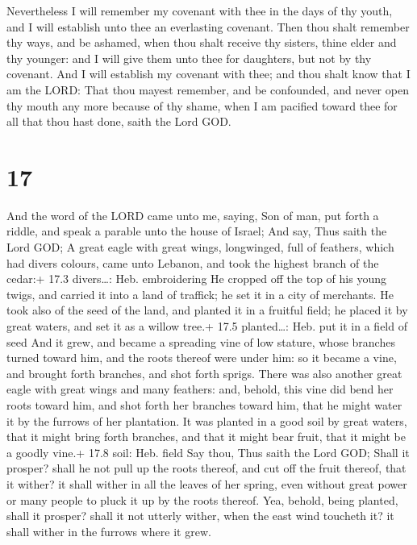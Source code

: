  Nevertheless I will remember my covenant with thee in
the days of thy youth, and I will establish unto thee an everlasting
covenant.  Then thou shalt remember thy ways, and be
ashamed, when thou shalt receive thy sisters, thine elder and thy
younger: and I will give them unto thee for daughters, but not by thy
covenant.  And I will establish my covenant with thee; and
thou shalt know that I am the LORD:  That thou mayest
remember, and be confounded, and never open thy mouth any more because
of thy shame, when I am pacified toward thee for all that thou hast
done, saith the Lord GOD.

\hypertarget{section-16}{%
\section{17}\label{section-16}}

 And the word of the LORD came unto me, saying, 
Son of man, put forth a riddle, and speak a parable unto the house of
Israel;  And say, Thus saith the Lord GOD; A great eagle
with great wings, longwinged, full of feathers, which had divers
colours, came unto Lebanon, and took the highest branch of the cedar:+
17.3 divers\ldots: Heb. embroidering  He cropped off the top
of his young twigs, and carried it into a land of traffick; he set it in
a city of merchants.  He took also of the seed of the land,
and planted it in a fruitful field; he placed it by great waters, and
set it as a willow tree.+ 17.5 planted\ldots: Heb. put it in a field of
seed  And it grew, and became a spreading vine of low
stature, whose branches turned toward him, and the roots thereof were
under him: so it became a vine, and brought forth branches, and shot
forth sprigs.  There was also another great eagle with great
wings and many feathers: and, behold, this vine did bend her roots
toward him, and shot forth her branches toward him, that he might water
it by the furrows of her plantation.  It was planted in a
good soil by great waters, that it might bring forth branches, and that
it might bear fruit, that it might be a goodly vine.+ 17.8 soil: Heb.
field  Say thou, Thus saith the Lord GOD; Shall it prosper?
shall he not pull up the roots thereof, and cut off the fruit thereof,
that it wither? it shall wither in all the leaves of her spring, even
without great power or many people to pluck it up by the roots thereof.
 Yea, behold, being planted, shall it prosper? shall it not
utterly wither, when the east wind toucheth it? it shall wither in the
furrows where it grew.

